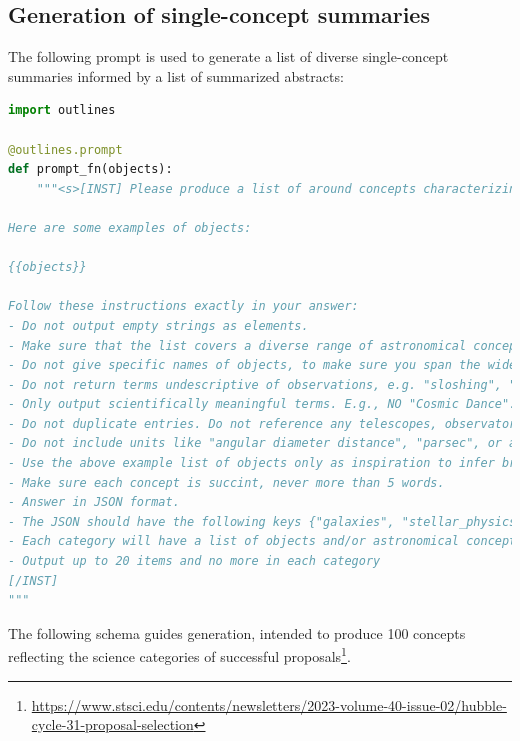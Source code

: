 \documentclass[10pt]{article} %
\begin{document}
\subsection{Generation of single-concept summaries}
\label{app:singleconcept}

The following prompt is used to generate a list of diverse single-concept summaries informed by a list of summarized abstracts:

\begin{lstlisting}[language=Python]
import outlines   

@outlines.prompt
def prompt_fn(objects):
    """<s>[INST] Please produce a list of around concepts characterizing prominent objects, phenomena, and science use cases of images observed by the Hubble Space Telescope.

Here are some examples of objects:

{{objects}}

Follow these instructions exactly in your answer:
- Do not output empty strings as elements.
- Make sure that the list covers a diverse range of astronomical concepts, with items as different from each other as possible. 
- Do not give specific names of objects, to make sure you span the widest possible range of concepts (e.g., "dwarf galaxy" is allowed, but NOT "Fornax", "Terzan 5", or  "NGC6440").
- Do not return terms undescriptive of observations, e.g. "sloshing", "adiabatic", "interactions". Returning concrete physics objects, concepts, or phenomena.
- Only output scientifically meaningful terms. E.g., NO "Cosmic Dance".
- Do not duplicate entries. Do not reference any telescopes, observatories, or surveys.
- Do not include units like "angular diameter distance", "parsec", or any other concepts that will not correlate with images of observations.
- Use the above example list of objects only as inspiration to infer broad classes of objects.
- Make sure each concept is succint, never more than 5 words.
- Answer in JSON format.
- The JSON should have the following keys {"galaxies", "stellar_physics", "exoplanets_planet_formation", "stellar_populations", "supermassive_black_holes", "solar_system", "integalactic_medium", "large_scale_structure"} reflecting rough observation categories.
- Each category will have a list of objects and/or astronomical concepts.
- Output up to 20 items and no more in each category
[/INST]
"""
\end{lstlisting}

The following schema guides generation, intended to produce 100 concepts reflecting the science categories of successful proposals\footnote{\url{https://www.stsci.edu/contents/newsletters/2023-volume-40-issue-02/hubble-cycle-31-proposal-selection}}. 
\end{document}
